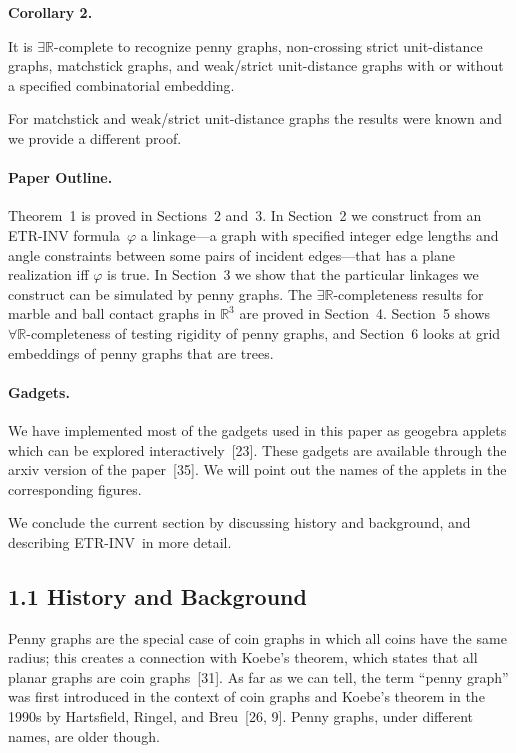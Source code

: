 \documentclass{article}
\begin{document}
\par\medskip\noindent\textbf{Corollary 2.} \begin{itshape}
 It is \ensuremath{\exists\mathbb{R}}-complete to recognize penny graphs, non-crossing strict unit-distance graphs,  matchstick graphs, 
 and weak/strict unit-distance graphs with or without a specified combinatorial embedding.
\end{itshape}\par\medskip

For matchstick and weak/strict unit-distance graphs the results were known and we provide a different proof.

\paragraph{Paper Outline.}
Theorem~1 is proved in Sections~2 and~3.  
In Section~2 we 
construct from an ETR-INV formula~$\varphi$ 
a linkage---a graph with specified integer edge lengths and angle constraints between some pairs of incident edges---that has a plane
realization iff $\varphi$ is true. 
In Section~3 we show that the particular linkages we construct can be simulated by penny graphs.
The \ensuremath{\exists\mathbb{R}}-completeness results for marble and ball contact graphs in $\ensuremath{\mathbb{R}}^3$ are proved in Section~4.
Section~5 shows $\ensuremath{\forall\mathbb{R}}$-completeness of testing rigidity of penny graphs, and Section~6 looks at grid embeddings of penny graphs 
that are trees.

\paragraph{Gadgets.}
We have implemented most of the gadgets used in this paper as geogebra applets which can be explored interactively~[23]. These gadgets are available through the arxiv version of the paper~[35]. We will point out the names of the applets in the corresponding figures.

We conclude the current section by discussing history and background, and describing \textnormal{\textsc{ETR-INV}}\ in more detail.

\subsection*{1.1 History and Background}

Penny graphs are the special case of coin graphs in which all coins have the same radius; this creates a connection with Koebe's theorem, which states that all planar graphs are coin graphs~[31]. As far as we can tell, the term ``penny graph'' was first introduced in the context of coin graphs and Koebe's theorem in the 1990s by Hartsfield, Ringel, and Breu~[26, 9]. Penny graphs, under different names, are older though. 
\end{document}
